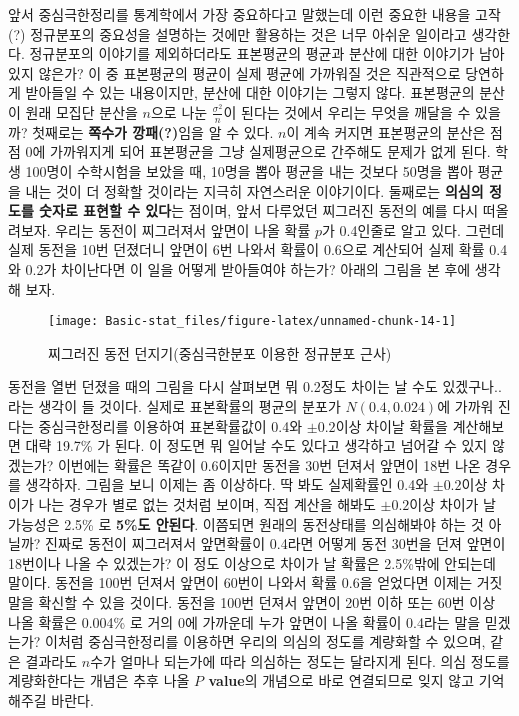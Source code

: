 \documentclass[]{book}
\begin{document}
앞서 중심극한정리를 통계학에서 가장 중요하다고 말했는데 이런 중요한
내용을 고작(?) 정규분포의 중요성을 설명하는 것에만 활용하는 것은 너무
아쉬운 일이라고 생각한다. 정규분포의 이야기를 제외하더라도 표본평균의
평균과 분산에 대한 이야기가 남아있지 않은가? 이 중 표본평균의 평균이
실제 평균에 가까워질 것은 직관적으로 당연하게 받아들일 수 있는
내용이지만, 분산에 대한 이야기는 그렇지 않다. 표본평균의 분산이 원래
모집단 분산을 \(n\)으로 나눈 \(\frac{\sigma^2}{n}\)이 된다는 것에서
우리는 무엇을 깨달을 수 있을까? 첫째로는 \textbf{쪽수가 깡패(?)}임을 알
수 있다. \(n\)이 계속 커지면 표본평균의 분산은 점점 0에 가까워지게 되어
표본평균을 그냥 실제평균으로 간주해도 문제가 없게 된다. 학생 100명이
수학시험을 보았을 때, 10명을 뽑아 평균을 내는 것보다 50명을 뽑아 평균을
내는 것이 더 정확할 것이라는 지극히 자연스러운 이야기이다. 둘째로는
\textbf{의심의 정도를 숫자로 표현할 수 있다}는 점이며, 앞서 다루었던
찌그러진 동전의 예를 다시 떠올려보자. 우리는 동전이 찌그러져서 앞면이
나올 확률 \(p\)가 0.4인줄로 알고 있다. 그런데 실제 동전을 10번 던졌더니
앞면이 6번 나와서 확률이 0.6으로 계산되어 실제 확률 0.4와 0.2가
차이난다면 이 일을 어떻게 받아들여야 하는가? 아래의 그림을 본 후에
생각해 보자.

\begin{figure}

{\centering \texttt{[image: Basic-stat\_files/figure-latex/unnamed-chunk-14-1]} 

}

\caption{찌그러진 동전 던지기(중심극한분포 이용한 정규분포 근사)}\label{fig:unnamed-chunk-14}
\end{figure}

동전을 열번 던졌을 때의 그림을 다시 살펴보면 뭐 0.2정도 차이는 날 수도
있겠구나.. 라는 생각이 들 것이다. 실제로 표본확률의 평균의 분포가
\(N(0.4,0.024)\)에 가까워 진다는 중심극한정리를 이용하여 표본확률값이
0.4와 \(\pm 0.2\)이상 차이날 확률을 계산해보면 대략 19.7\% 가 된다. 이
정도면 뭐 일어날 수도 있다고 생각하고 넘어갈 수 있지 않겠는가? 이번에는
확률은 똑같이 0.6이지만 동전을 30번 던져서 앞면이 18번 나온 경우를
생각하자. 그림을 보니 이제는 좀 이상하다. 딱 봐도 실제확률인 0.4와
\(\pm 0.2\)이상 차이가 나는 경우가 별로 없는 것처럼 보이며, 직접 계산을
해봐도 \(\pm 0.2\)이상 차이가 날 가능성은 2.5\% 로 \textbf{5\%도
안된다}. 이쯤되면 원래의 동전상태를 의심해봐야 하는 것 아닐까? 진짜로
동전이 찌그러져서 앞면확률이 0.4라면 어떻게 동전 30번을 던져 앞면이
18번이나 나올 수 있겠는가? 이 정도 이상으로 차이가 날 확률은 2.5\%밖에
안되는데 말이다. 동전을 100번 던져서 앞면이 60번이 나와서 확률 0.6을
얻었다면 이제는 거짓말을 확신할 수 있을 것이다. 동전을 100번 던져서
앞면이 20번 이하 또는 60번 이상 나올 확률은 0.004\% 로 거의 0에 가까운데
누가 앞면이 나올 확률이 0.4라는 말을 믿겠는가? 이처럼 중심극한정리를
이용하면 우리의 의심의 정도를 계량화할 수 있으며, 같은 결과라도
\(n\)수가 얼마나 되는가에 따라 의심하는 정도는 달라지게 된다. 의심
정도를 계량화한다는 개념은 추후 나올 \textbf{\(P\) value}의 개념으로
바로 연결되므로 잊지 않고 기억해주길 바란다.
\end{document}
